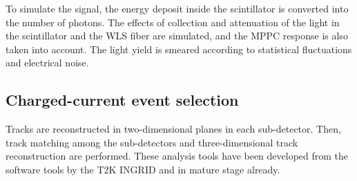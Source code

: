 

To simulate the signal, the energy deposit inside the scintillator is converted into the number of photons. 
The effects of collection and attenuation of the light in the scintillator and the WLS fiber are simulated, and the MPPC response is also taken into account. 
The light yield is smeared according to statistical fluctuations and electrical noise.


\subsection{Charged-current event selection}

Tracks are reconstructed in two-dimensional planes in each sub-detector.
Then, track matching among the sub-detectors and three-dimensional track reconstruction are performed.
These analysis tools have been developed from the software tools by the T2K INGRID and in mature stage already.

